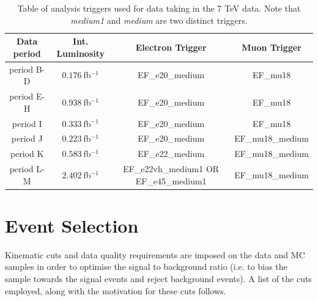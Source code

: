\begin{table}
	\begin{center}
	\begin{tabular}{|c|c|c|c|}
	\hline
	Data period & Int. Luminosity & Electron Trigger & Muon Trigger \\
	\hline
	period B-D    & $0.176~$fb$^{-1}$  & EF\_e20\_medium     & EF\_mu18        \\
	period E-H    & $0.938~$fb$^{-1}$  & EF\_e20\_medium     & EF\_mu18        \\
	period I      & $0.333~$fb$^{-1}$  & EF\_e20\_medium     & EF\_mu18        \\	
    period J      & $0.223~$fb$^{-1}$  & EF\_e20\_medium     & EF\_mu18\_medium\\
	period K      & $0.583~$fb$^{-1}$  & EF\_e22\_medium     & EF\_mu18\_medium\\
	period L-M    & $2.402~$fb$^{-1}$  & EF\_e22vh\_medium1 OR EF\_e45\_medium1     & EF\_mu18\_medium\\
	\hline
	\end{tabular}
	\end{center}
	\caption{Table of analysis triggers used for data taking in the 7 TeV data. Note that \emph{medium1} and \emph{medium} are two distinct triggers.}
	\label{tab:analysis_triggers}
\end{table}


\section{Event Selection}
\label{sec:event_selection}

Kinematic cuts and data quality requirements are imposed on the data and MC samples in order to optimise the signal to background ratio (i.e. to bias the sample towards the signal events and reject background events). A list of the cuts employed, along with the motivation for these cuts follows. 

